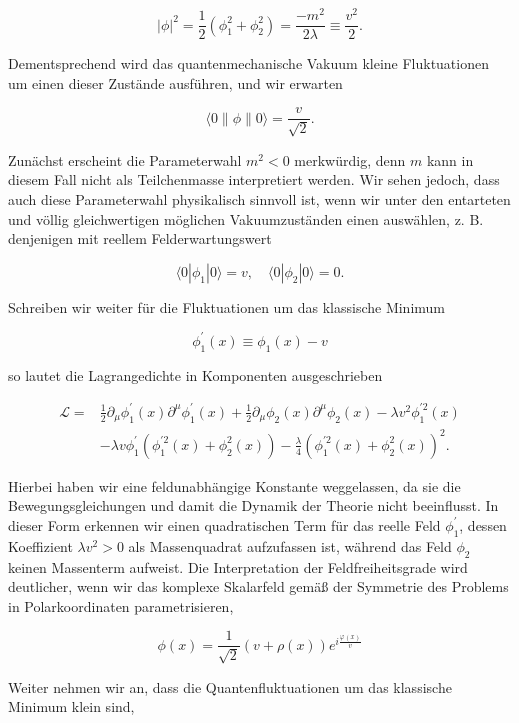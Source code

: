 \documentclass[10pt, letterpaper]{article}
\begin{document}
$$
|\phi|^{2}=\frac{1}{2}\left(\phi_{1}^{2}+\phi_{2}^{2}\right)=\frac{-m^{2}}{2 \lambda} \equiv \frac{v^{2}}{2} .
$$

Dementsprechend wird das quantenmechanische Vakuum kleine Fluktuationen um einen dieser Zustände ausführen, und wir erwarten

$$
\langle 0\|\phi\| 0\rangle=\frac{v}{\sqrt{2}} .
$$

Zunächst erscheint die Parameterwahl $m^{2}<0$ merkwürdig, denn $m$ kann in diesem Fall nicht als Teilchenmasse interpretiert werden. Wir sehen jedoch, dass auch diese Parameterwahl physikalisch sinnvoll ist, wenn wir unter den entarteten und völlig gleichwertigen möglichen Vakuumzuständen einen auswählen, z. B. denjenigen mit reellem Felderwartungswert

$$
\langle 0| \phi_{1}|0\rangle=v, \quad\langle 0| \phi_{2}|0\rangle=0 .
$$

Schreiben wir weiter für die Fluktuationen um das klassische Minimum

$$
\phi_{1}^{\prime}(x) \equiv \phi_{1}(x)-v
$$

so lautet die Lagrangedichte in Komponenten ausgeschrieben

$$
\begin{aligned}
\mathscr{L}= & \frac{1}{2} \partial_{\mu} \phi_{1}^{\prime}(x) \partial^{\mu} \phi_{1}^{\prime}(x)+\frac{1}{2} \partial_{\mu} \phi_{2}(x) \partial^{\mu} \phi_{2}(x)-\lambda v^{2} \phi_{1}^{\prime 2}(x) \\
& -\lambda v \phi_{1}^{\prime}\left(\phi_{1}^{\prime 2}(x)+\phi_{2}^{2}(x)\right)-\frac{\lambda}{4}\left(\phi_{1}^{\prime 2}(x)+\phi_{2}^{2}(x)\right)^{2} .
\end{aligned}
$$

Hierbei haben wir eine feldunabhängige Konstante weggelassen, da sie die Bewegungsgleichungen und damit die Dynamik der Theorie nicht beeinflusst. In dieser Form erkennen wir einen quadratischen Term für das reelle Feld $\phi_{1}^{\prime}$, dessen Koeffizient $\lambda v^{2}>0$ als Massenquadrat aufzufassen ist, während das Feld $\phi_{2}$ keinen Massenterm aufweist. Die Interpretation der Feldfreiheitsgrade wird deutlicher, wenn wir das komplexe Skalarfeld gemäß der Symmetrie des Problems in Polarkoordinaten parametrisieren,

$$
\phi(x)=\frac{1}{\sqrt{2}}(v+\rho(x)) e^{i \frac{\varphi(x)}{v}}
$$

Weiter nehmen wir an, dass die Quantenfluktuationen um das klassische Minimum klein sind,
\end{document}
